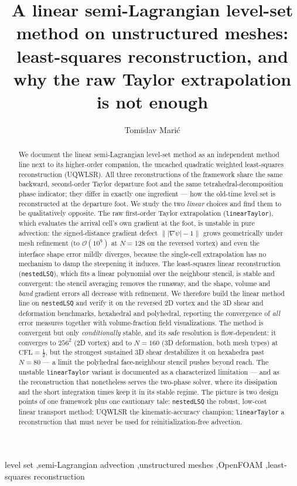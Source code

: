 \documentclass[preprint,3p,11pt]{elsarticle}
\begin{document}
\begin{frontmatter}

\title{A linear semi-Lagrangian level-set method on unstructured meshes:
least-squares reconstruction, and why the raw Taylor extrapolation is not
enough}

\author[tuda]{Tomislav Mari\'{c}}
\address[tuda]{Mathematical Modeling and Analysis, TU Darmstadt, Germany}

\begin{abstract}
We document the linear semi-Lagrangian level-set method as an independent
method line next to its higher-order companion, the uncached quadratic
weighted least-squares reconstruction (UQWLSR). All three reconstructions of
the framework share the same backward, second-order Taylor departure foot and
the same tetrahedral-decomposition phase indicator; they differ in exactly
one ingredient --- how the old-time level set is reconstructed at the
departure foot. We study the two \emph{linear} choices and find them to be
qualitatively opposite. The raw first-order Taylor extrapolation
(\texttt{linearTaylor}), which evaluates the arrival cell's own gradient at
the foot, is unstable in pure advection: the signed-distance gradient defect
$\||\nabla\psi|-1\|$ grows geometrically under mesh refinement (to
$\mathcal{O}(10^{9})$ at $N=128$ on the reversed vortex) and even the
interface shape error mildly diverges, because the single-cell extrapolation
has no mechanism to damp the steepening it induces. The least-squares linear
reconstruction (\texttt{nestedLSQ}), which fits a linear polynomial over the
neighbour stencil, is stable and convergent: the stencil averaging removes
the runaway, and the shape, volume and \emph{band} gradient errors all
decrease with refinement. We therefore build the linear method line on
\texttt{nestedLSQ} and verify it on the reversed 2D vortex and the 3D shear
and deformation benchmarks, hexahedral and polyhedral, reporting the
convergence of \emph{all} error measures together with volume-fraction field
visualizations. The method is convergent but only \emph{conditionally}
stable, and its safe resolution is flow-dependent: it converges to $256^2$
(2D vortex) and to $N=160$ (3D deformation, both mesh types) at
$\mathrm{CFL}=\tfrac12$, but the strongest sustained 3D shear destabilizes it
on hexahedra past $N=80$ --- a limit the polyhedral face-neighbour stencil
pushes beyond reach. The unstable \texttt{linearTaylor} variant is documented
as a characterized limitation --- and as the reconstruction that nonetheless
serves the two-phase solver, where its dissipation and the short integration
times keep it in its stable regime. The picture is two design points of one
framework plus one cautionary tale: \texttt{nestedLSQ} the robust, low-cost
linear transport method; UQWLSR the kinematic-accuracy champion;
\texttt{linearTaylor} a reconstruction that must never be used for
reinitialization-free advection.
\end{abstract}

\begin{keyword}
level set \sep semi-Lagrangian advection \sep unstructured meshes
\sep OpenFOAM \sep least-squares reconstruction
\end{keyword}
\end{frontmatter}
\end{document}
